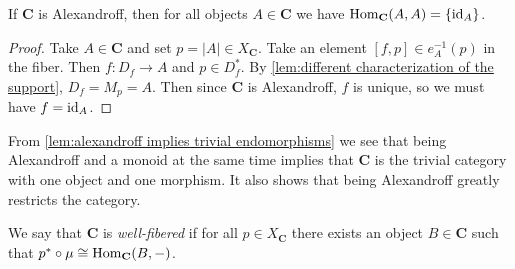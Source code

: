 \begin{lemma}
\label{lem:alexandroff implies trivial endomorphisms}
If $\mathbf{C}$ is Alexandroff, then for all objects $A \in \mathbf{C}$ we have $\operatorname{Hom}_{\mathbf{C}}(A,A) = \{\operatorname{id}_A\}$.
\end{lemma}
\begin{proof}
Take $A \in \mathbf{C}$ and set $p = |A| \in X_{\mathbf{C}}$. Take an element $[f,p] \in e_A^{-1}(p)$ in the fiber. Then $f : D_f \to A$ and $p \in D_f^*$. By \cref{lem:different characterization of the support}, $D_f = M_p = A$. Then since $\mathbf{C}$ is Alexandroff, $f$ is unique, so we must have $f = \operatorname{id}_A$.
\end{proof}
From \cref{lem:alexandroff implies trivial endomorphisms} we see that being Alexandroff and a monoid at the same time implies that $\mathbf{C}$ is the trivial category with one object and one morphism. It also shows that being Alexandroff greatly restricts the category.

\begin{definition}
\label{def:well-fibered}
We say that $\mathbf{C}$ is \emph{well-fibered} if for all $p \in X_\mathbf{C}$ there exists an object $B \in \mathbf{C}$ such that $p^* \circ \operatorname{\mu} \cong \operatorname{Hom}_\mathbf{C}(B,-)$.
\end{definition}

